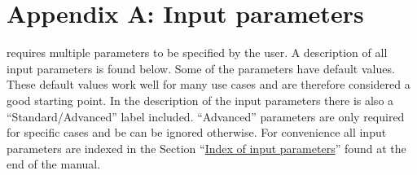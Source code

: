 \section*{Appendix A: Input parameters} \label{sec:parameters}
\setcounter{section}{1}
\renewcommand{\thesection}{\Alph{section}}

\asli{} requires multiple parameters to be specified by the user. A description of all input parameters is found below. Some of the parameters have default values. These default values work well for many use cases and are therefore considered a good starting point. In the description of the input parameters there is also a ``Standard/Advanced'' label included. ``Advanced'' parameters are only required for specific cases and be can be ignored otherwise. For convenience all input parameters are indexed in the Section ``\hyperref[sec:index inputs full]{Index of input parameters}'' found at the end of the manual.

